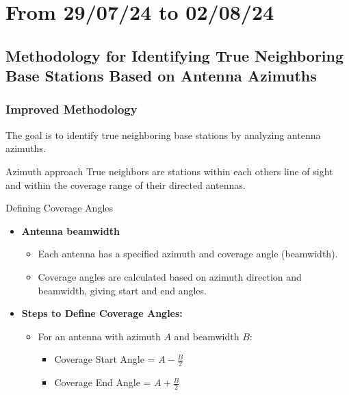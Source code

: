 \smallframetitle

\section{From 29/07/24 to 02/08/24}
\insertsectionframe

\subsection{Methodology for Identifying True Neighboring Base Stations Based on Antenna Azimuths}
\insertsubsectionframe


\begin{frame}
    \frametitle{Improved Methodology}
    The goal is to identify true neighboring base stations by analyzing antenna azimuths.
    \begin{block}{Azimuth approach}
        True neighbors are stations within each others line of sight and within the coverage range of their directed antennas.
    \end{block}
    \begin{block}{Defining Coverage Angles}
        \begin{itemize}
            \item \textbf{Antenna beamwidth}
            \begin{itemize}
                \item Each antenna has a specified azimuth and coverage angle (beamwidth).
                \item Coverage angles are calculated based on azimuth direction and beamwidth, giving start and end angles.
            \end{itemize}
            \item \textbf{Steps to Define Coverage Angles:}
            \begin{itemize}
                \item For an antenna with azimuth \( A \) and beamwidth \( B \):
                \begin{itemize}
                    \item Coverage Start Angle = \( A - \frac{B}{2} \)
                    \item Coverage End Angle = \( A + \frac{B}{2} \)
                \end{itemize}
            \end{itemize}
        \end{itemize}
    \end{block}
\end{frame}

